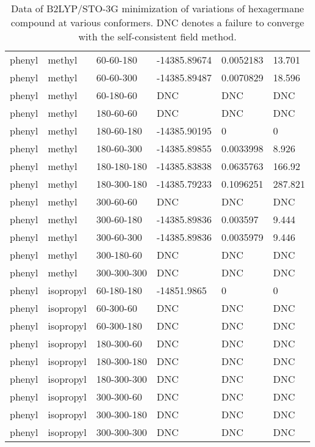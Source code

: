 \begin{table}[]
\begin{tabular}{llllll}
		phenyl & methyl & 60-60-180 & -14385.89674 & 0.0052183 & 13.701 \\
		phenyl & methyl & 60-60-300 & -14385.89487 & 0.0070829 & 18.596 \\
		phenyl & methyl & 60-180-60 & DNC & DNC & DNC \\
		phenyl & methyl & 180-60-60 & DNC & DNC & DNC \\
		phenyl & methyl & 180-60-180 & -14385.90195 & 0 & 0 \\
		phenyl & methyl & 180-60-300 & -14385.89855 & 0.0033998 & 8.926 \\
		phenyl & methyl & 180-180-180 & -14385.83838 & 0.0635763 & 166.92 \\
		phenyl & methyl & 180-300-180 & -14385.79233 & 0.1096251 & 287.821 \\
		phenyl & methyl & 300-60-60 & DNC & DNC & DNC \\
		phenyl & methyl & 300-60-180 & -14385.89836 & 0.003597 & 9.444 \\
		phenyl & methyl & 300-60-300 & -14385.89836 & 0.0035979 & 9.446 \\
		phenyl & methyl & 300-180-60 & DNC & DNC & DNC \\
		phenyl & methyl & 300-300-300 & DNC & DNC & DNC \\ \hline
		phenyl & isopropyl & 60-180-180 & -14851.9865 & 0 & 0 \\
		phenyl & isopropyl & 60-300-60 & DNC & DNC & DNC \\
		phenyl & isopropyl & 60-300-180 & DNC & DNC & DNC \\
		phenyl & isopropyl & 180-300-60 & DNC & DNC & DNC \\
		phenyl & isopropyl & 180-300-180 & DNC & DNC & DNC \\
		phenyl & isopropyl & 180-300-300 & DNC & DNC & DNC \\
		phenyl & isopropyl & 300-300-60 & DNC & DNC & DNC \\
		phenyl & isopropyl & 300-300-180 & DNC & DNC & DNC \\
		phenyl & isopropyl & 300-300-300 & DNC & DNC & DNC
	\end{tabular}
	\caption{Data of B2LYP/STO-3G minimization of variations of hexagermane compound at various conformers. DNC denotes a failure to converge with the self-consistent field method.}
	\label{tab:Ge6Ver2Data}
\end{table}


